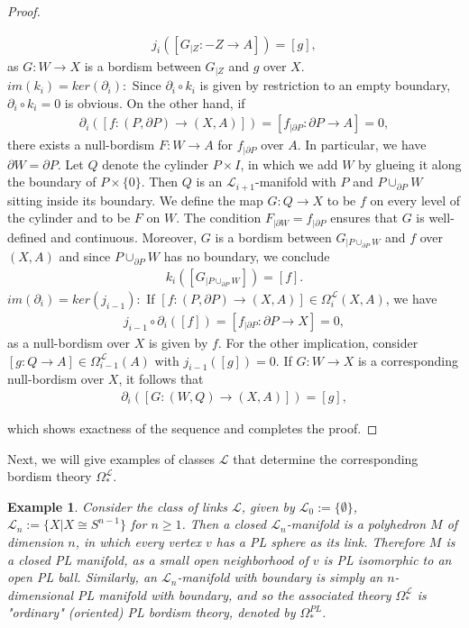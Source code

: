 \documentclass{scrreprt}
\newtheorem{example}[prop]{Example}
\begin{document}
\begin{proof}
\begin{itemize}
\begin{align*}
j_i([G_{|Z}: -Z \to A]) = [g],
\end{align*}
as $G: W \to X$ is a bordism between $G_{|Z}$ and $g$ over $X$. \\
$im(k_i)=ker(\partial_i):$ Since $\partial_i \circ k_i$ is given by restriction to an empty boundary, $\partial_i \circ k_i=0$ is obvious. On the other hand, if 
\begin{align*}
\partial_i([f:(P, \partial P) \to (X,A)])= [f_{| \partial P} : \partial P \to A] = 0,
\end{align*}
there exists a null-bordism $F: W \to A$ for $f_{| \partial P}$ over $A$. In particular, we have $\partial W= \partial P$. Let $Q$ denote the cylinder $P \times I$, in which we add $W$ by glueing it along the boundary of $P \times \{ 0 \}$. Then $Q$ is an $\mathcal{L}_{i+1}$-manifold with $P$ and $P \cup_{\partial P} W$ sitting inside its boundary. We define the map $G: Q \to X$ to be $f$ on every level of the cylinder and to be $F$ on $W$. The condition $F_{| \partial W}=f_{| \partial P}$ ensures that $G$ is well-defined and continuous. Moreover, $G$ is a bordism between $G_{|P \cup_{\partial P} W}$ and $f$ over $(X,A)$ and since $P \cup_{\partial P} W$ has no boundary, we conclude 
\begin{align*}
k_i([G_{|P \cup_{\partial P} W}])=[f].
\end{align*}
$im(\partial_i)= ker(j_{i-1}):$ If $[f:(P, \partial P) \to (X,A)] \in \Omega_{i}^{\mathcal{L}}(X,A)$, we have 
\begin{align*}
j_{i-1} \circ \partial_i ([f])= [f_{| \partial P}: \partial P \to X] = 0,
\end{align*}
as a null-bordism over $X$ is given by $f$. For the other implication, consider $[g: Q \to A] \in \Omega_{i-1}^{\mathcal{L}}(A)$ with $j_{i-1}([g])=0$. If $G: W \to X$ is a corresponding null-bordism over $X$, it follows that
\begin{align*}
\partial_i([G: (W,Q) \to (X,A)]) = [g],
\end{align*}
\end{itemize}
which shows exactness of the sequence and completes the proof.
\end{proof}

Next, we will give examples of classes $\mathcal{L}$ that determine the corresponding bordism theory $\Omega_*^{\mathcal{L}}$.

\begin{example}
Consider the class of links $\mathcal{L}$, given by $\mathcal{L}_0 := \{ \emptyset \}$, $\mathcal{L}_n:= \{ X | X \cong S^{n-1} \}$ for $n \geq 1$. Then a closed $\mathcal{L}_n$-manifold is a polyhedron $M$ of dimension $n$, in which every vertex $v$ has a PL sphere as its link. Therefore $M$ is a closed PL manifold, as a small open neighborhood of $v$ is PL isomorphic to an open PL ball. Similarly, an $\mathcal{L}_n$-manifold with boundary is simply an $n$-dimensional PL manifold with boundary, and so the associated theory $\Omega_*^{\mathcal{L}}$ is "ordinary" (oriented) PL bordism theory, denoted by $\Omega_*^{PL}$.
\end{example}
\end{document}
